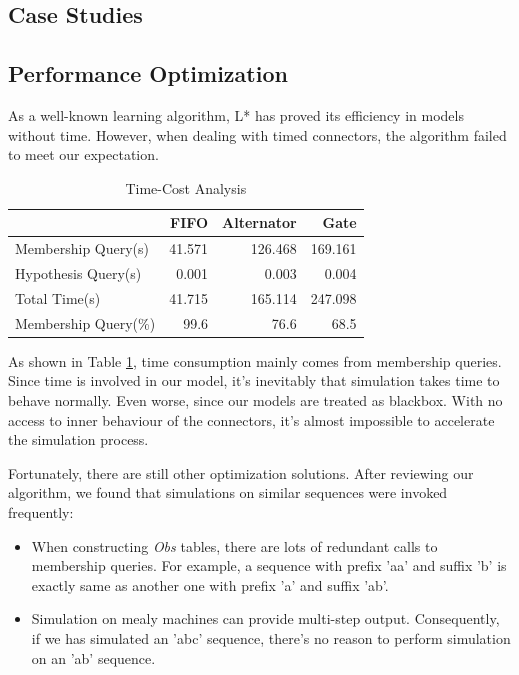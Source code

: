 \documentclass[conference, a4paper]{IEEEtran}
\begin{document}
\subsection{Case Studies}
 
\subsection{Performance Optimization}
As a well-known learning algorithm, L* has proved its efficiency in models without time.
However, when dealing with timed connectors, the algorithm failed to meet our expectation.

\begin{table}[h]
  \renewcommand{\arraystretch}{1.3}
  \caption{Time-Cost Analysis}
  \label{tabel:timecost}
  \centering
  \begin{tabular}{l||rrr}
    \hline
    & FIFO & Alternator & Gate \\
    \hline\hline
    Membership Query(s) & 41.571 & 126.468 & 169.161 \\
    Hypothesis Query(s) & 0.001 & 0.003 & 0.004 \\
    Total Time(s) & 41.715 & 165.114 & 247.098\\
    Membership Query(\%) & 99.6 & 76.6 & 68.5\\
    \hline
  \end{tabular}
\end{table}

As shown in Table \ref{tabel:timecost}, time consumption mainly comes from membership queries.
Since time is involved in our model, it's inevitably that simulation takes time to behave normally.
Even worse, since our models are treated as blackbox. With no access to inner behaviour of the
connectors, it's almost impossible to accelerate the simulation process.

Fortunately, there are still other optimization solutions. After reviewing our algorithm, we found
that simulations on similar sequences were invoked frequently:

\begin{itemize}
  \item When constructing \emph{Obs} tables, there are lots of redundant calls to membership
    queries. For example, a sequence with prefix 'aa' and suffix 'b' is exactly same as another one
    with prefix 'a' and suffix 'ab'.
  \item Simulation on mealy machines can provide multi-step output. Consequently, if we has
    simulated an 'abc' sequence, there's no reason to perform simulation on an 'ab' sequence.
\end{itemize}
\end{document}
